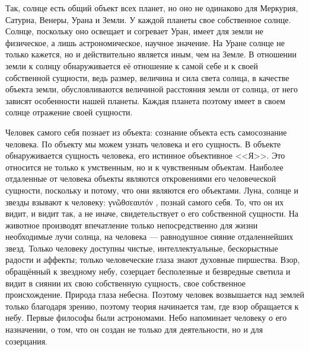 \documentclass[12pt,oneside]{book}
\newcommand{\textgreek}[1]{
\begingroup\fontencoding{LGR}\selectfont#1\endgroup
}
\begin{document}
Так, солнце есть общий объект всех планет, но оно не одинаково для Меркурия, Сатурна, Венеры, Урана и Земли. У каждой планеты свое собственное солнце. Солнце, поскольку оно освещает и согревает Уран, имеет для земли не физическое, а лишь астрономическое, научное значение. На Уране солнце не только кажется, но и действительно является иным, чем на Земле. В отношении земли к солнцу обнаруживается её отношение к самой себе и к своей собственной сущности, ведь размер, величина и сила света солнца, в качестве объекта земли, обусловливаются величиной расстояния земли от солнца, от него зависят особенности нашей планеты. Каждая планета поэтому имеет в своем солнце отражение своей сущности.

Человек самого себя познает из объекта: сознание объекта есть самосознание человека. По объекту мы можем узнать человека и его сущность. В объекте обнаруживается сущность человека, его истинное объективное <<Я>>. Это относится не только к умственным, но и к чувственным объектам. Наиболее отдаленные от человека объекты являются откровениями его человеческой сущности, поскольку и потому, что они являются его объектами. Луна, солнце и звезды взывают к человеку: \textgreek{γνῶθσεαυτόν}, познай самого себя. То, что он их видит, и видит так, а не иначе, свидетельствует о его собственной сущности. На животное производят впечатление только непосредственно для жизни необходимые лучи солнца, на человека --- равнодушное сияние отдаленнейших звезд. Только человеку доступны чистые, интеллектуальные, бескорыстные радости и аффекты; только человеческие глаза знают духовные пиршества. Взор, обращённый к звездному небу, созерцает бесполезные и безвредные светила и видит в сиянии их свою собственную сущность, свое собственное происхождение. Природа глаза небесна. Поэтому человек возвышается над землей только благодаря зрению, поэтому теория начинается там, где взор обращается к небу. Первые философы были астрономами. Небо напоминает человеку о его назначении, о том, что он создан не только для деятельности, но и для созерцания.
\end{document}
